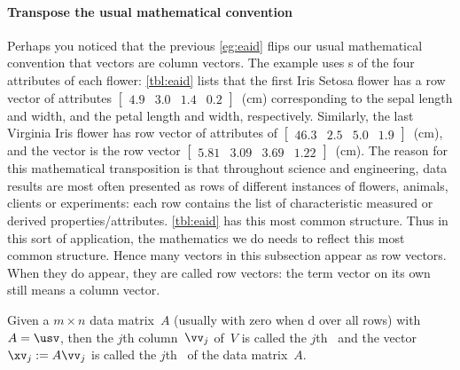 \paragraph{Transpose the usual mathematical convention}
Perhaps you noticed that the previous \autoref{eg:eaid} flips our usual mathematical convention that vectors are column vectors.
The example uses s of the four attributes of each flower: 
\autoref{tbl:eaid} lists that the first Iris Setosa flower has a row vector of attributes \(\begin{bmatrix} 4.9&3.0&1.4&0.2 \end{bmatrix}\)~(cm) corresponding to the sepal length and width, and the petal length and width, respectively.
Similarly, the last Virginia Iris flower has row vector of attributes of \(\begin{bmatrix} 46.3&2.5&5.0&1.9 \end{bmatrix}\)~(cm), and the  vector is the row vector \(\begin{bmatrix} 5.81&3.09&3.69&1.22 \end{bmatrix}\)~(cm).
The reason for this mathematical transposition is that throughout science and engineering, data results are most often presented as rows of different instances of flowers, animals, clients or experiments: each row contains the list of characteristic measured or derived properties\slash attributes.
\autoref{tbl:eaid} has this most common structure.
Thus in this sort of application, the mathematics we do needs to reflect this most common structure.
Hence many vectors in this subsection appear as row vectors.
When they do appear, they are called row vectors: the term vector on its own still means a column vector.




\begin{definition} \label{def:pc}
Given a \(m\times n\) data matrix~\(A\) (usually with zero  when d over all rows) with  \svd\ \(A=\usv\), then the \(j\)th column~\(\vv_j\) of~\(V\) is called the \(j\)th~ and the vector \(\xv_j:=A\vv_j\) is called the \(j\)th~ of the data matrix~\(A\).
\end{definition}



